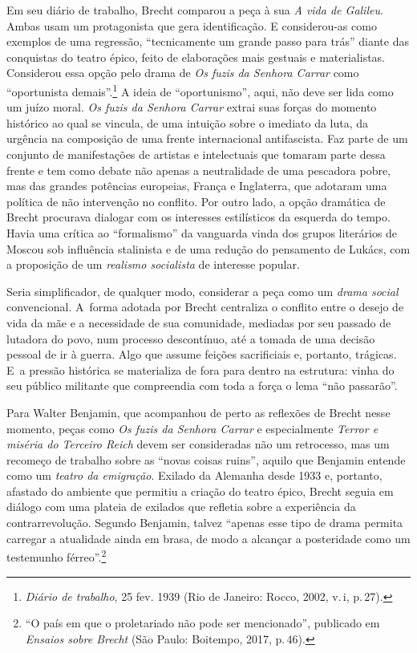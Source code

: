 Em seu diário de trabalho, Brecht comparou a peça à sua {\it A vida de
Galileu}. Ambas usam um protagonista que gera identificação. E
considerou-as como exemplos de uma regressão, “tecnicamente um grande
passo para trás” diante das conquistas do teatro épico, feito de
elaborações mais gestuais e materialistas. Considerou essa opção pelo
drama de {\it Os fuzis da Senhora Carrar} como “oportunista
demais”.\footnote{{\it Diário de trabalho}, 25 fev. 1939 (Rio de Janeiro:
  Rocco, 2002, v.\,{\sc i}, p.\,27).} A ideia de “oportunismo”, aqui, não deve
ser lida como um juízo moral. {\it Os fuzis da Senhora Carrar} extrai
suas forças do momento histórico ao qual se vincula, de uma intuição
sobre o imediato da luta, da urgência na composição de uma frente
internacional antifascista. Faz parte de um conjunto de manifestações de
artistas e intelectuais que tomaram parte dessa frente e tem como debate
não apenas a neutralidade de uma pescadora pobre, mas das grandes
potências europeias, França e Inglaterra, que adotaram uma política de
não intervenção no conflito. Por outro lado, a opção dramática de Brecht
procurava dialogar com os interesses estilísticos da esquerda do tempo.
Havia uma crítica ao “formalismo” da vanguarda vinda dos grupos
literários de Moscou sob influência stalinista e de uma redução do
pensamento de Lukács, com a proposição de um {\it realismo socialista}
de interesse popular.

Seria simplificador, de qualquer modo, considerar a peça como um
{\it drama social} convencional. A~forma adotada por Brecht centraliza
o conflito entre o desejo de vida da mãe e a necessidade de sua
comunidade, mediadas por seu passado de lutadora do povo, num processo
descontínuo, até a tomada de uma decisão pessoal de ir à guerra. Algo
que assume feições sacrificiais e, portanto, trágicas. E~a pressão
histórica se materializa de fora para dentro na estrutura: vinha do seu
público militante que compreendia com toda a força o lema “não
passarão”.

Para Walter Benjamin, que acompanhou de perto as reflexões de Brecht
nesse momento, peças como {\it Os fuzis da Senhora Carrar} e
especialmente {\it Terror e miséria do Terceiro Reich} devem ser
consideradas não um retrocesso, mas um recomeço de trabalho sobre as
“novas coisas ruins”, aquilo que Benjamin entende como um {\it teatro da
emigração}. Exilado da Alemanha desde 1933 e, portanto, afastado do
ambiente que permitiu a criação do teatro épico, Brecht seguia em
diálogo com uma plateia de exilados que refletia sobre a experiência da
contrarrevolução. Segundo Benjamin, talvez “apenas esse tipo de drama
permita carregar a atualidade ainda em brasa, de modo a alcançar a
posteridade como um testemunho férreo”.\footnote{“O país em que o
  proletariado não pode ser mencionado”, publicado em {\it Ensaios sobre
  Brecht} (São Paulo: Boitempo, 2017, p.\,46).}


